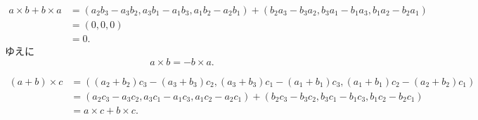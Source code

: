 
\begin{tproof}
  \begin{align*}
    a \times b + b \times a & = (a_2 b_3 - a_3 b_2, a_3 b_1 - a_1 b_3, a_1 b_2 - a_2 b_1) + (b_2 a_3 - b_3 a_2, b_3 a_1 - b_1 a_3, b_1 a_2 - b_2 a_1) \\
                            & = (0, 0, 0)                                                                                                             \\
                            & = 0.
  \end{align*}
  ゆえに
  \[
    a \times b = - b \times a.
  \]
\end{tproof}


\begin{tproof}
  \begin{align*}
    (a + b) \times c & = ( (a_2 + b_2) c_3 - (a_3 + b_3) c_2, (a_3 + b_3) c_1 - (a_1 + b_1) c_3, (a_1 + b_1) c_2 - (a_2 + b_2) c_1 ) \\
                     & =(a_2 c_3-a_3 c_2, a_3 c_1-a_1 c_3, a_1 c_2-a_2 c_1) + (b_2 c_3-b_3 c_2, b_3 c_1-b_1 c_3, b_1 c_2-b_2 c_1)    \\
                     & = a \times c + b \times c.
  \end{align*}
\end{tproof}


